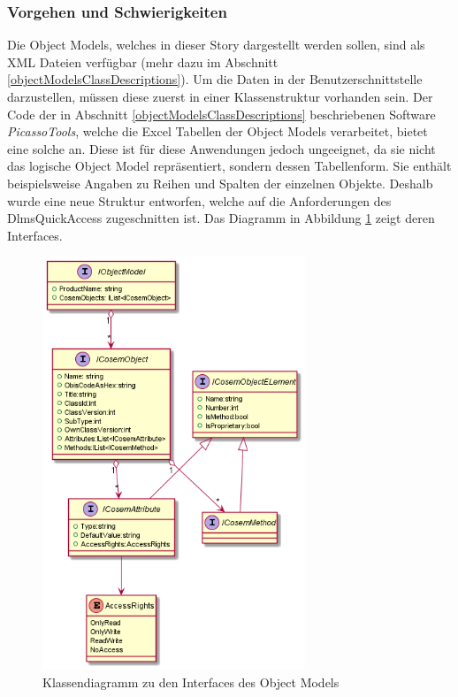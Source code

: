 \subsubsection{Vorgehen und Schwierigkeiten}\label{objectModelDevSchwierigkeiten}
Die Object Models, welches in dieser Story dargestellt werden sollen, sind als XML Dateien verfügbar (mehr dazu im Abschnitt \ref{objectModelsClassDescriptions}).
Um die Daten in der Benutzerschnittstelle darzustellen, müssen diese zuerst in einer Klassenstruktur vorhanden sein.
Der Code der in Abschnitt \ref{objectModelsClassDescriptions} beschriebenen Software \textit{PicassoTools}, welche die Excel Tabellen der Object Models verarbeitet, bietet eine solche an.
Diese ist für diese Anwendungen jedoch ungeeignet, da sie nicht das logische Object Model repräsentiert, sondern dessen Tabellenform.
Sie enthält beispielsweise Angaben zu Reihen und Spalten der einzelnen Objekte.
Deshalb wurde eine neue Struktur entworfen, welche auf die Anforderungen des DlmsQuickAccess zugeschnitten ist.
Das Diagramm in Abbildung \ref{fig:objectModelInterface} zeigt deren Interfaces.

\begin{figure}
   \centering
   \includegraphics[width=0.7\textwidth]{gfx/ObjectModel_interfaces.png}
   \caption{
      Klassendiagramm zu den Interfaces des Object Models
      }
      \label{fig:objectModelInterface}
\end{figure}

